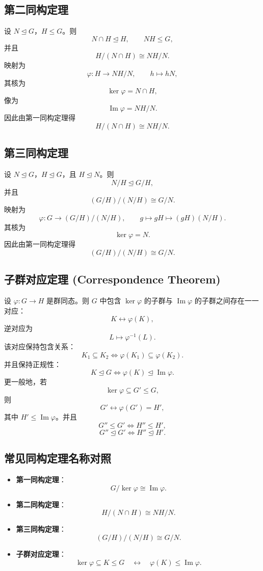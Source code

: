 \documentclass[12pt, a4paper]{article}
\begin{document}
\subsection*{第二同构定理}
设 \(N\trianglelefteq G\)，\(H\le G\)。则
\[
N\cap H\trianglelefteq H,\qquad NH\le G,
\]
并且
\[
H/(N\cap H)\cong NH/N.
\]
映射为
\[
\varphi:H\to NH/N,\qquad h\mapsto hN,
\]
其核为
\[
\ker\varphi=N\cap H,
\]
像为
\[
\operatorname{Im}\varphi=NH/N.
\]
因此由第一同构定理得
\[
H/(N\cap H)\cong NH/N.
\]

\subsection*{第三同构定理}
设 \(N\trianglelefteq G\)，\(H\trianglelefteq G\)，且 \(H\trianglelefteq N\)。则
\[
N/H\trianglelefteq G/H,
\]
并且
\[
(G/H)\big/(N/H)\cong G/N.
\]
映射为
\[
\varphi:G\to (G/H)\big/(N/H),\qquad
g\mapsto gH\mapsto (gH)(N/H).
\]
其核为
\[
\ker\varphi=N.
\]
因此由第一同构定理得
\[
(G/H)\big/(N/H)\cong G/N.
\]

\subsection*{子群对应定理 (Correspondence Theorem)}
设 \(\varphi:G\to H\) 是群同态。则 \(G\) 中包含 \(\ker\varphi\) 的子群与 \(\operatorname{Im}\varphi\) 的子群之间存在一一对应：
\[
K\longleftrightarrow \varphi(K),
\]
逆对应为
\[
L\longmapsto \varphi^{-1}(L).
\]
该对应保持包含关系：
\[
K_1\subseteq K_2
\iff
\varphi(K_1)\subseteq \varphi(K_2).
\]
并且保持正规性：
\[
K\trianglelefteq G
\iff
\varphi(K)\trianglelefteq \operatorname{Im}\varphi.
\]
更一般地，若
\[
\ker\varphi\subseteq G'\le G,
\]
则
\[
G'\longleftrightarrow \varphi(G')=H',
\]
其中 \(H'\le \operatorname{Im}\varphi\)。并且
\[
G''\le G'
\iff
H''\le H',
\]
\[
G''\trianglelefteq G'
\iff
H''\trianglelefteq H'.
\]

\subsection*{常见同构定理名称对照}
\begin{itemize}
  \item \textbf{第一同构定理}：
  \[
  G/\ker\varphi\cong \operatorname{Im}\varphi.
  \]
  \item \textbf{第二同构定理}：
  \[
  H/(N\cap H)\cong NH/N.
  \]
  \item \textbf{第三同构定理}：
  \[
  (G/H)\big/(N/H)\cong G/N.
  \]
  \item \textbf{子群对应定理}：
  \[
  \ker\varphi\subseteq K\le G
  \quad\longleftrightarrow\quad
  \varphi(K)\le \operatorname{Im}\varphi.
  \]
\end{itemize}
\end{document}

